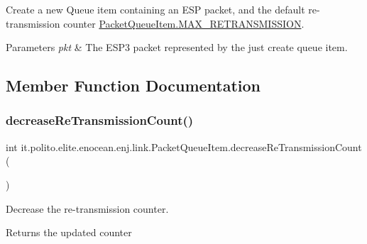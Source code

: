 Create a new Queue item containing an E\+SP packet, and the default re-\/transmission counter \hyperlink{classit_1_1polito_1_1elite_1_1enocean_1_1enj_1_1link_1_1_packet_queue_item_ad213f916f09ec73b7165e227e9674100}{Packet\+Queue\+Item.\+M\+A\+X\+\_\+\+R\+E\+T\+R\+A\+N\+S\+M\+I\+S\+S\+I\+ON}.


\begin{DoxyParams}{Parameters}
{\em pkt} & The E\+S\+P3 packet represented by the just create queue item. \\
\hline
\end{DoxyParams}


\subsection{Member Function Documentation}
\hypertarget{classit_1_1polito_1_1elite_1_1enocean_1_1enj_1_1link_1_1_packet_queue_item_af092ce7adaa96e710397b0b73ff958af}{}\label{classit_1_1polito_1_1elite_1_1enocean_1_1enj_1_1link_1_1_packet_queue_item_af092ce7adaa96e710397b0b73ff958af} 
\subsubsection{\texorpdfstring{decrease\+Re\+Transmission\+Count()}{decreaseReTransmissionCount()}}
{\footnotesize\ttfamily int it.\+polito.\+elite.\+enocean.\+enj.\+link.\+Packet\+Queue\+Item.\+decrease\+Re\+Transmission\+Count (\begin{DoxyParamCaption}{ }\end{DoxyParamCaption})}

Decrease the re-\/transmission counter.

\begin{DoxyReturn}{Returns}
the updated counter 
\end{DoxyReturn}
\hypertarget{classit_1_1polito_1_1elite_1_1enocean_1_1enj_1_1link_1_1_packet_queue_item_a88def3a14b97244d26e56739e2d3f2cb}{}\label{classit_1_1polito_1_1elite_1_1enocean_1_1enj_1_1link_1_1_packet_queue_item_a88def3a14b97244d26e56739e2d3f2cb} 
